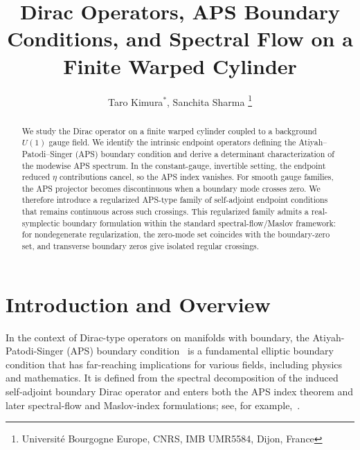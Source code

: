 \documentclass[11pt]{article}
\title{Dirac Operators, APS Boundary Conditions, and Spectral Flow on a Finite Warped Cylinder}
\author{Taro Kimura$^*$, Sanchita Sharma%
\thanks{Université Bourgogne Europe, CNRS, IMB UMR5584, Dijon, France}}
\date{}
\theoremstyle{definition}
\numberwithin{equation}{section}
\begin{document}
 
\maketitle
\begin{abstract}
We study the Dirac operator on a finite warped cylinder coupled to a background \(U(1)\) gauge field. We identify the intrinsic endpoint operators defining the Atiyah--Patodi--Singer (APS) boundary condition and derive a determinant characterization of the modewise APS spectrum. In the constant-gauge, invertible setting, the endpoint reduced $\eta$ contributions cancel, so the APS index vanishes. For smooth gauge families, the APS projector becomes discontinuous when a boundary mode crosses zero. We therefore introduce a regularized APS-type family of self-adjoint endpoint conditions that remains continuous across such crossings. This regularized family admits a real-symplectic boundary formulation within the standard spectral-flow/Maslov framework: for nondegenerate regularization, the zero-mode set coincides with the boundary-zero set, and transverse boundary zeros give isolated regular crossings.
\end{abstract}
\setcounter{tocdepth}{2}
\tableofcontents 
\section{Introduction and Overview} 

In the context of Dirac-type operators on manifolds with boundary, the Atiyah-Patodi-Singer (APS) boundary condition~\cite{APS1,APS2,APS3} is a fundamental elliptic boundary condition that has far-reaching implications for various fields, including physics and mathematics. It is defined from the spectral decomposition of the induced self-adjoint boundary Dirac operator and enters both the APS index theorem and later spectral-flow and Maslov-index formulations; see, for example,~\cite{LawsonMichelsohn,BGV,Hijazi,BoossWojciechowski,BaerBallmann2012}. 
\end{document}
